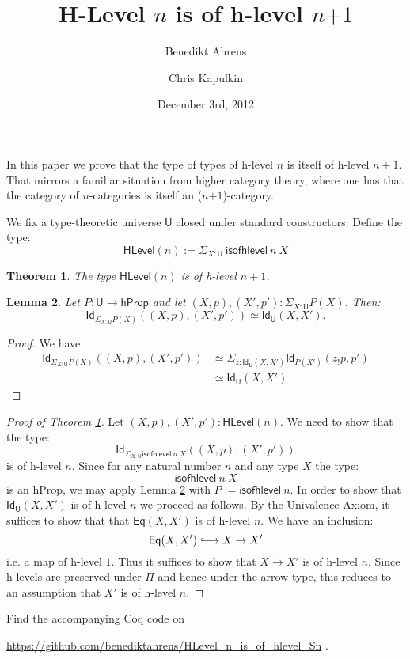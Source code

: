 \documentclass[11pt]{amsart}
\theoremstyle{plain}
\newtheorem{theorem}{Theorem}
\newtheorem{lemma}[theorem]{Lemma}
\theoremstyle{definition}
\newcommand{\Eq}{\mathsf{Eq}}
\newcommand{\HLevel}{\mathsf{HLevel}}
\newcommand{\hProp}{\mathsf{hProp}}
\newcommand{\Id}{\mathsf{Id}}
\newcommand{\isofhlevel}{\mathsf{isofhlevel}}
\newcommand{\sfPi}{\mathsf{\Pi}}
\newcommand{\sfSigma}{\mathsf{\Sigma}}
\newcommand{\U}{\mathsf{U}}
\newcommand{\oftype}{\! : \!}
\newcommand*{\into}{\ensuremath{\lhook\joinrel\relbar\joinrel\rightarrow}}
\begin{document}
\title{H-Level $n$ is of h-level $n\mbox{+}1$}

\author{Benedikt Ahrens}

\author{Chris Kapulkin}

\date{December 3rd, 2012}
\maketitle

In this paper we prove that the type of types of h-level $n$ is itself of h-level $n+1$. That mirrors a familiar situation from higher category theory, where one has that the category of $n$-categories is itself an ($n\mbox{+}1$)-category.

We fix a type-theoretic universe $\U$ closed under standard constructors. Define the type:
 \[\HLevel(n) := \sfSigma_{X : \U} \ \isofhlevel \ n \ X \]

\begin{theorem}\label{main_thm}
 The type $\HLevel(n)$ is of h-level $n+1$.
\end{theorem}

\begin{lemma}\label{Id_of_Sigma}
 Let $P \colon \U \to \hProp$ and let $(X, p), (X', p') \oftype \sfSigma_{X : \U} P(X)$. Then:
 \[ \Id_{\sfSigma_{X : \U} P(X)} ((X, p), (X', p')) \simeq \Id_{\U} (X, X').\]
\end{lemma}

\begin{proof}
 We have:
 \begin{equation*}\begin{split}
  \Id_{\sfSigma_{X : \U} P(X)} ((X, p), (X', p')) & \simeq \sfSigma_{z : \Id_{\U}(X, X')} \Id_{P(X')}(z_!p, p') \\
  & \simeq \Id_{\U} (X, X')
 \end{split}
 \end{equation*}
\end{proof}

\begin{proof}[Proof of Theorem \ref{main_thm}]
 Let $(X, p), (X', p') \oftype \HLevel(n)$. We need to show that the type:
 \[ \Id_{\sfSigma_{X : \U} \isofhlevel \ n \ X} ((X, p), (X', p')) \]
 is of h-level $n$. Since for any natural number $n$ and any type $X$ the type:
 \[\isofhlevel \ n \ X \]
 is an hProp, we may apply Lemma \ref{Id_of_Sigma} with $P := \isofhlevel \ n$. In order to show that $\Id_{\U} (X, X')$ is of h-level $n$ we proceed as follows. By the Univalence Axiom, it suffices to show that that $\Eq(X, X')$ is of h-level $n$. We have an inclusion:
 \[\Eq (X, X') \into X \rightarrow X'\]
 i.e. a map of h-level $1$. Thus it suffices to show that $X \rightarrow X'$ is of h-level $n$. Since h-levels are preserved under $\sfPi$ and hence under the arrow type, this reduces to an assumption that $X'$ is of h-level $n$.
\end{proof}

\noindent
Find the accompanying \textsf{Coq} code on
\begin{center}
\url{https://github.com/benediktahrens/HLevel_n_is_of_hlevel_Sn} .
\end{center}
\end{document}

